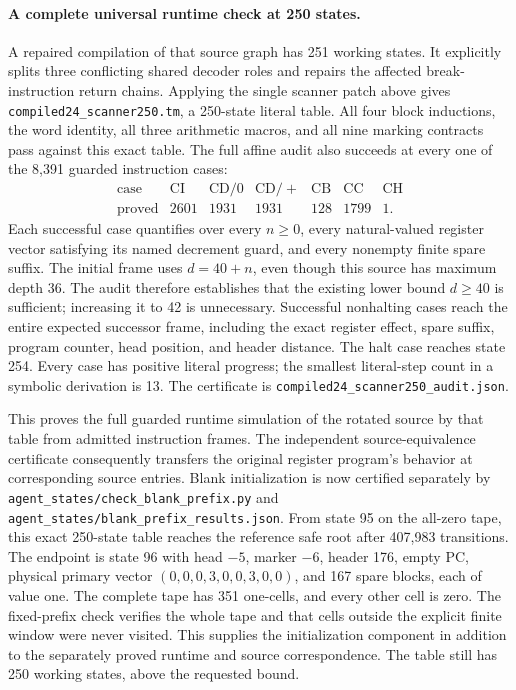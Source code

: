 \paragraph{A complete universal runtime check at 250 states.}
A repaired compilation of that source graph has 251 working states.
It explicitly splits three conflicting shared decoder roles and
repairs the affected break-instruction return chains.  Applying the
single scanner patch above gives
\texttt{compiled24\_scanner250.tm}, a 250-state literal table.
All four block inductions, the word identity, all three arithmetic
macros, and all nine marking contracts pass against this exact table.
The full affine audit also succeeds at every one of the 8,391 guarded
instruction cases:
\[
\begin{array}{c|rrrrrr}
 \text{case}&\mathrm{CI}&\mathrm{CD}/0&\mathrm{CD}/+&
              \mathrm{CB}&\mathrm{CC}&\mathrm{CH}\\\hline
 \text{proved}&2601&1931&1931&128&1799&1.
\end{array}
\]
Each successful case quantifies over every $n\geq0$, every
natural-valued register vector satisfying its named decrement guard,
and every nonempty finite spare suffix.  The initial frame uses
$d=40+n$, even though this source has maximum depth 36.  The audit
therefore establishes that the existing lower bound $d\geq40$ is
sufficient; increasing it to 42 is unnecessary.  Successful
nonhalting cases reach the entire expected successor frame, including
the exact register effect, spare suffix, program counter, head
position, and header distance.  The halt case reaches state 254.
Every case has positive literal progress; the smallest literal-step
count in a symbolic derivation is 13.  The certificate is
\texttt{compiled24\_scanner250\_audit.json}.

This proves the full guarded runtime simulation of the rotated source
by that table from admitted instruction frames.  The independent
source-equivalence certificate consequently transfers the original
register program's behavior at corresponding source entries.
Blank initialization is now certified separately by
\texttt{agent\_states/check\_blank\_prefix.py} and
\texttt{agent\_states/blank\_prefix\_results.json}.  From state 95
on the all-zero tape, this exact 250-state table reaches the reference
safe root after 407,983 transitions.  The endpoint is state 96 with
head $-5$, marker $-6$, header 176, empty PC, physical primary vector
$(0,0,0,3,0,0,3,0,0)$, and 167 spare blocks, each of value one.
The complete tape has 351 one-cells, and every other cell is zero.
The fixed-prefix check verifies the whole tape and that cells outside
the explicit finite window were never visited.  This supplies the initialization component in
addition to the separately proved runtime and source correspondence.
The table still has 250 working states, above the requested bound.

